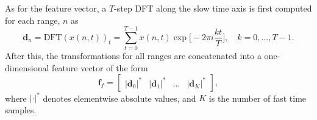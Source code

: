 




As for the feature vector, a $T$-step DFT along the slow time axis is first computed for each range, $n$ as
\begin{equation}
	\mathbf{d}_n=\text{DFT}(x(n,t))_t =  \sum_{t=0}^{T-1}x(n,t)\exp\Big[-2\pi i\frac{kt}{T}\Big], \quad k=0,...,T-1.
\end{equation}
After this, the transformations for all ranges are concatenated into a one-dimensional feature vector of the form
\begin{equation}
	\textbf{f}_{f}=\begin{bmatrix} |\mathbf{d}_0|^* & |\mathbf{d}_1|^* & \hdots & |\mathbf{d}_K|^* \end{bmatrix},
\end{equation}
where $|\cdot|^*$ denotes elementwise absolute values, and $K$ is the number of fast time samples.


